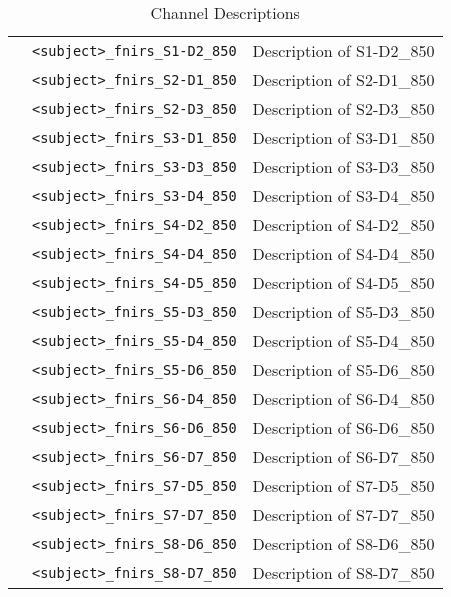 \begin{table}
\begin{tabularx}{\textwidth}{|l|l|X|}
& \texttt{<subject>\_fnirs\_S1-D2\_850} & Description of S1-D2\_850 \\
& \texttt{<subject>\_fnirs\_S2-D1\_850} & Description of S2-D1\_850 \\
& \texttt{<subject>\_fnirs\_S2-D3\_850} & Description of S2-D3\_850 \\
& \texttt{<subject>\_fnirs\_S3-D1\_850} & Description of S3-D1\_850 \\
& \texttt{<subject>\_fnirs\_S3-D3\_850} & Description of S3-D3\_850 \\
& \texttt{<subject>\_fnirs\_S3-D4\_850} & Description of S3-D4\_850 \\
& \texttt{<subject>\_fnirs\_S4-D2\_850} & Description of S4-D2\_850 \\
& \texttt{<subject>\_fnirs\_S4-D4\_850} & Description of S4-D4\_850 \\
& \texttt{<subject>\_fnirs\_S4-D5\_850} & Description of S4-D5\_850 \\
& \texttt{<subject>\_fnirs\_S5-D3\_850} & Description of S5-D3\_850 \\
& \texttt{<subject>\_fnirs\_S5-D4\_850} & Description of S5-D4\_850 \\
& \texttt{<subject>\_fnirs\_S5-D6\_850} & Description of S5-D6\_850 \\
& \texttt{<subject>\_fnirs\_S6-D4\_850} & Description of S6-D4\_850 \\
& \texttt{<subject>\_fnirs\_S6-D6\_850} & Description of S6-D6\_850 \\
& \texttt{<subject>\_fnirs\_S6-D7\_850} & Description of S6-D7\_850 \\
& \texttt{<subject>\_fnirs\_S7-D5\_850} & Description of S7-D5\_850 \\
& \texttt{<subject>\_fnirs\_S7-D7\_850} & Description of S7-D7\_850 \\
& \texttt{<subject>\_fnirs\_S8-D6\_850} & Description of S8-D6\_850 \\
& \texttt{<subject>\_fnirs\_S8-D7\_850} & Description of S8-D7\_850 \\
\hline
\end{tabularx}
\caption{Channel Descriptions}
\label{tab:fNIRS_raw_channels}
\end{table}

